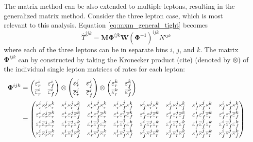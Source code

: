 The matrix method can be also extended to multiple leptons,
resulting in the generalized matrix method. 
Consider the three lepton case, which is most relevant to this
analysis. 
Equation \eqref{eq:mxm_general_tight} becomes
\begin{equation}
\hat{T}^{ijk} = \mathbf{M}\mathbf{\Phi}^{ijk}\mathbf{W}(\mathbf{\Phi}^{-1})^{ijk} N^{ijk}
\end{equation}
where each of the three leptons can be in separate bins $i$, $j$, and $k$.
The matrix $\mathbf{\Phi}^{ijk}$
can by constructed by taking the Kronecker product (cite) (denoted by $\otimes$)
of the individual single lepton matrices of rates for each lepton:
\begin{align}
  \mathbf{\Phi}^{ijk} &=
  \begin{pmatrix}
  \real^i & \fake^i \\ \realbar^i & \fakebar^i
  \end{pmatrix} 
  \otimes
  \begin{pmatrix}
  \real^j & \fake^j \\ \realbar^j & \fakebar^j
  \end{pmatrix} 
  \otimes
  \begin{pmatrix}
  \real^k & \fake^k \\ \realbar^k & \fakebar^k
  \end{pmatrix} \\
  &=
  \begin{pmatrix} 
  \real^i\real^j\real^k  &
  \real^i\real^j\fake^k  &
  \real^i\fake^j\real^k  &
  \real^i\fake^j\fake^k  &
  \fake^i\real^j\real^k  &
  \fake^i\real^j\fake^k  &
  \fake^i\fake^j\real^k  &
  \fake^i\fake^j\fake^k  \\
  \real^i\real^j\realbar^k  &
  \real^i\real^j\fakebar^k  &
  \real^i\fake^j\realbar^k  &
  \real^i\fake^j\fakebar^k  &
  \fake^i\real^j\realbar^k  &
  \fake^i\real^j\fakebar^k  &
  \fake^i\fake^j\realbar^k  &
  \fake^i\fake^j\fakebar^k  \\
  \real^i\realbar^j\real^k  &
  \real^i\realbar^j\fake^k  &
  \real^i\fakebar^j\real^k  &
  \real^i\fakebar^j\fake^k  &
  \fake^i\realbar^j\real^k  &
  \fake^i\realbar^j\fake^k  &
  \fake^i\fakebar^j\real^k  &
  \fake^i\fakebar^j\fake^k  \\
  \real^i\realbar^j\realbar^k  &
  \real^i\realbar^j\fakebar^k  &
  \real^i\fakebar^j\realbar^k  &
  \real^i\fakebar^j\fakebar^k  &
  \fake^i\realbar^j\realbar^k  &
  \fake^i\realbar^j\fakebar^k  &
  \fake^i\fakebar^j\realbar^k  &
  \fake^i\fakebar^j\fakebar^k  \\

\end{pmatrix}
\end{align}
